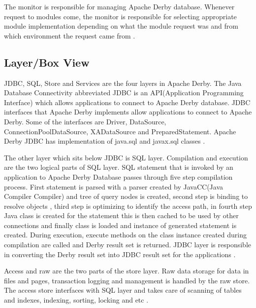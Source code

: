 \documentclass[9pt,twocolumn,twoside]{../../styles/osajnl}
\begin{document}
The monitor is responsible for managing Apache Derby
database. Whenever request to modules come, the monitor is responsible
for selecting appropriate module implementation depending on what the
module request was and from which environment the request came from
\cite{www-derbyarch}.

\subsection{Layer/Box View} 

JDBC, SQL, Store and Services are the four layers in Apache Derby. The
Java Database Connectivity abbreviated JDBC is an API(Application
Programming Interface) which allows applications to connect to Apache
Derby database. JDBC interfaces that Apache Derby implements allow
applications to connect to Apache Derby. Some of the interfaces are
Driver, DataSource, ConnectionPoolDataSource, XADataSource and
PreparedStatement. Apache Derby JDBC has implementation of java.sql
and javax.sql classes \cite{www-derbyarch}.


The other layer which sits below JDBC is SQL layer. Compilation and
execution are the two logical parts of SQL layer. SQL statement that
is invoked by an application to Apache Derby Database passes through
five step compilation process. First statement is parsed with a parser
created by JavaCC(Java Compiler Compiler) and tree of query nodes is
created, second step is binding to resolve objects , third step is
optimizing to identify the access path, in fourth step Java class is
created for the statement this is then cached to be used by other
connections and finally class is loaded and instance of generated
statement is created. During execution, execute methods on the class
instance created during compilation are called and Derby result set is
returned. JDBC layer is responsible in converting the Derby result set
into JDBC result set for the applications \cite{www-derbyarch}.

Access and raw are the two parts of the store layer. Raw data storage
for data in files and pages, transaction logging and management is
handled by the raw store. The access store interfaces with SQL layer
and takes care of scanning of tables and indexes, indexing, sorting,
locking and etc \cite{www-derbyarch}.
\end{document}
